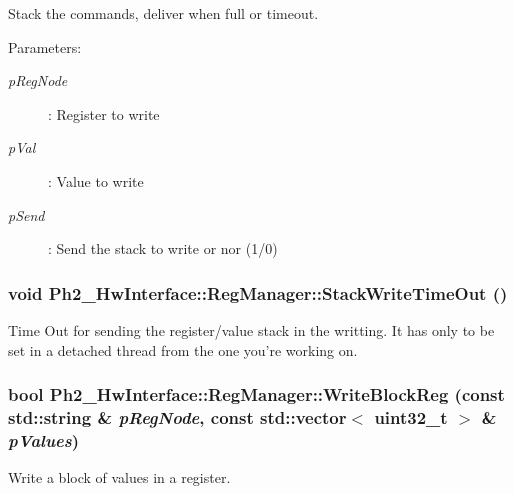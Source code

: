 Stack the commands, deliver when full or timeout. 

\begin{Desc}
\item[Parameters:]
\begin{description}
\item[{\em p\-Reg\-Node}]: Register to write \item[{\em p\-Val}]: Value to write \item[{\em p\-Send}]: Send the stack to write or nor (1/0) \end{description}
\end{Desc}
\hypertarget{class_ph2___hw_interface_1_1_reg_manager_b4e24cf318772c09a6c7e24b88b1dedb}{
\subsubsection[StackWriteTimeOut]{\setlength{\rightskip}{0pt plus 5cm}void Ph2\_\-Hw\-Interface::Reg\-Manager::Stack\-Write\-Time\-Out ()}}
\label{class_ph2___hw_interface_1_1_reg_manager_b4e24cf318772c09a6c7e24b88b1dedb}


Time Out for sending the register/value stack in the writting. It has only to be set in a detached thread from the one you're working on. 

\hypertarget{class_ph2___hw_interface_1_1_reg_manager_888f5cccb05daa28896cf622abfdcbd6}{
\subsubsection[WriteBlockReg]{\setlength{\rightskip}{0pt plus 5cm}bool Ph2\_\-Hw\-Interface::Reg\-Manager::Write\-Block\-Reg (const std::string \& {\em p\-Reg\-Node}, const std::vector$<$ uint32\_\-t $>$ \& {\em p\-Values})}}
\label{class_ph2___hw_interface_1_1_reg_manager_888f5cccb05daa28896cf622abfdcbd6}


Write a block of values in a register. 

